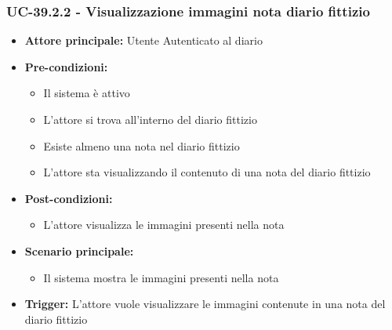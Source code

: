\documentclass[a4paper,12pt]{article}
\begin{document}
\subsubsection{UC-39.2.2 - Visualizzazione immagini nota diario fittizio} \label{subsec:UC-39.2.2}
\begin{itemize}
    \item \textbf{Attore principale:} Utente Autenticato al diario
    \item \textbf{Pre-condizioni:}
    \begin{itemize}
        \item Il sistema è attivo
        \item L'attore si trova all'interno del diario fittizio
        \item Esiste almeno una nota nel diario fittizio
        \item L'attore sta visualizzando il contenuto di una nota del diario fittizio
    \end{itemize}
    \item \textbf{Post-condizioni:}
    \begin{itemize}
        \item L'attore visualizza le immagini presenti nella nota
    \end{itemize}
    \item \textbf{Scenario principale:}
    \begin{itemize}
        \item Il sistema mostra le immagini presenti nella nota 
    \end{itemize}
    \item \textbf{Trigger:} L'attore vuole visualizzare le immagini contenute in una nota del diario fittizio
\end{itemize}
\end{document}
